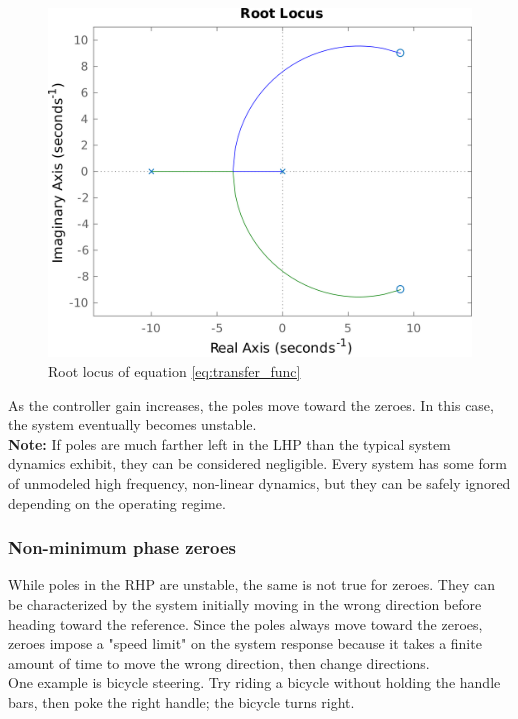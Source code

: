 \documentclass[10pt,conference,compsoc]{IEEEtran}
\begin{document}
\begin{figure}[H]
  \includegraphics[width=\linewidth]{figs/poster_rlocus.png}
  \caption{Root locus of equation \ref{eq:transfer_func}}
  \label{fig:poster_rlocus}
\end{figure}

\noindent As the controller gain increases, the poles move toward the zeroes. In
this case, the system eventually becomes unstable. \\

\noindent \textbf{Note:} If poles are much farther left in the LHP than the
typical system dynamics exhibit, they can be considered negligible. Every system
has some form of unmodeled high frequency, non-linear dynamics, but they can be
safely ignored depending on the operating regime.

\subsubsection{Non-minimum phase zeroes}

While poles in the RHP are unstable, the same is not true for zeroes. They can
be characterized by the system initially moving in the wrong direction before
heading toward the reference. Since the poles always move toward the zeroes,
zeroes impose a "speed limit" on the system response because it takes a finite
amount of time to move the wrong direction, then change directions. \\

\noindent One example is bicycle steering. Try riding a bicycle without holding
the handle bars, then poke the right handle; the bicycle turns right.
\end{document}
